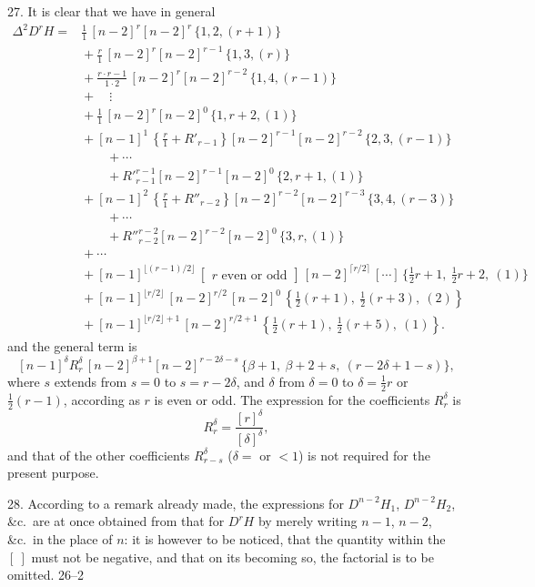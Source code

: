 \documentclass[11pt]{article}
\begin{document}
27. It is clear that we have in general
\[
\begin{aligned}
\Delta^2 D^r H = {}& \frac{1}{1}\,[n-2]^r[n-2]^r\,\{1, 2, (r+1)\}\\
&{} + \frac{r}{1}\,[n-2]^r[n-2]^{r-1}\,\{1, 3, (r)\}\\
&{} + \frac{r\cdot r - 1}{1\cdot 2}\,[n-2]^r[n-2]^{r-2}\,\{1, 4, (r-1)\}\\
&{} + \quad\vdots\\
&{} + \frac{1}{1}\,[n-2]^r[n-2]^0\,\{1, r+2, (1)\}\\[4pt]
&{} + [n-1]^1\,\left\{\frac{r}{1} + R'_{r-1}\right\}[n-2]^{r-1}[n-2]^{r-2}\,\{2, 3, (r-1)\}\\
&\qquad{} + \cdots\\
&\qquad{} + R'^{r-1}_{r-1}[n-2]^{r-1}[n-2]^0\,\{2, r+1, (1)\}\\[4pt]
&{} + [n-1]^2\,\left\{\frac{r}{1} + R''_{r-2}\right\}[n-2]^{r-2}[n-2]^{r-3}\,\{3, 4, (r-3)\}\\
&\qquad{} + \cdots\\
&\qquad{} + R''^{r-2}_{r-2}[n-2]^{r-2}[n-2]^0\,\{3, r, (1)\}\\[4pt]
&{} + \cdots\\[4pt]
&{} + [n-1]^{\lfloor (r-1)/2\rfloor}\,\left[\begin{array}{c}\text{$r$ even or odd}\end{array}\right]\,[n-2]^{\lceil r/2\rceil}\,[\cdots]\,\{\tfrac{1}{2}r+1,\ \tfrac{1}{2}r+2,\ (1)\}\\[4pt]
&{} + [n-1]^{\lfloor r/2\rfloor}\,[n-2]^{r/2}\,[n-2]^0\,\left\{\tfrac{1}{2}(r+1),\ \tfrac{1}{2}(r+3),\ (2)\right\}\\
&{} + [n-1]^{\lfloor r/2\rfloor + 1}\,[n-2]^{r/2 + 1}\,\left\{\tfrac{1}{2}(r+1),\ \tfrac{1}{2}(r+5),\ (1)\right\}.
\end{aligned}
\]
and the general term is
\[
[n-1]^\delta R_r^\delta\,[n-2]^{\beta+1}[n-2]^{r-2\delta - s}\,\{\beta+1,\ \beta+2+s,\ (r-2\delta+1-s)\},
\]
where $s$ extends from $s = 0$ to $s = r - 2\delta$, and $\delta$ from $\delta = 0$ to $\delta = \tfrac{1}{2}r$ or $\tfrac{1}{2}(r-1)$, according as $r$ is even or odd. The expression for the coefficients $R_r^\delta$ is
\[
R_r^\delta = \frac{[r]^\delta}{[\delta]^\delta},
\]
and that of the other coefficients $R_{r-s}^\delta$ ($\delta = $ or $< 1$) is not required for the present purpose.

\medskip

28. According to a remark already made, the expressions for $D^{n-2}H_1$, $D^{n-2}H_2$, \&c.\ are at once obtained from that for $D^rH$ by merely writing $n-1$, $n-2$, \&c.\ in the place of $n$: it is however to be noticed, that the quantity within the $[\ ]$ must not be negative, and that on its becoming so, the factorial is to be omitted.
\hfill 26--2
\end{document}

